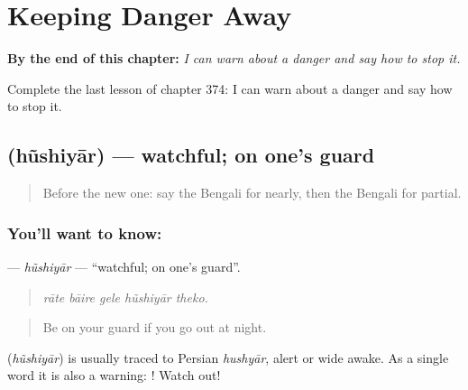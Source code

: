 
\chapter{Keeping Danger Away}
\label{ch:bn-keeping-danger-away}

\begin{chapteropening}
\textbf{By the end of this chapter:} \emph{I can warn about a danger and say how to stop it.}

Complete the last lesson of chapter 374: I can warn about a danger and say how to stop it.
\end{chapteropening}

\section[\texorpdfstring{\bn{হুঁশিয়ার} (hũshiyār)}{হুঁশিয়ার (hũshiyār)}]{ (hũshiyār) — watchful; on one's guard}

\label{lesson:BN-C374-hushiyar}



\begin{quote}
Before the new one: say the Bengali for nearly, then the Bengali for partial.
\end{quote}

\subsection*{You'll want to know: }
\textbf{} — \emph{hũshiyār} — \textquotedblleft{}watchful; on one's guard\textquotedblright{}.

\begin{quote}
    
\end{quote}

\begin{quote}
\emph{rāte bāire gele hũshiyār theko.}
\end{quote}

\begin{quote}
Be on your guard if you go out at night.
\end{quote}

\begin{cousinweb}
\textbf{} (\emph{hũshiyār}) is usually traced to Persian \emph{hushyār}, alert or wide awake. As a single word it is also a warning: ! Watch out!
\end{cousinweb}

